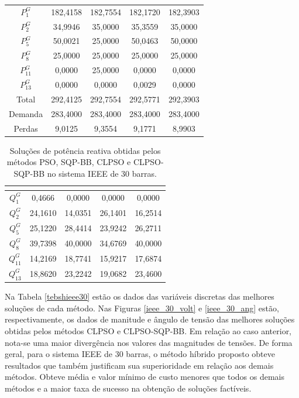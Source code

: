 \documentclass[
	12pt,				%
	openany,			%
	twoside,			%
	a4paper,			%
	chapter=TITLE,		%
	section=Title,		%
	subsection=Title,	%
	subsubsection=Title,%
	english,			%
	french,				%
	spanish,			%
	brazil			%
	]{abntex2}
\begin{document}
\begin{ERRATA}
\begin{table}[h!]
\begin{tabular}{c c c c c}
 \rule{0mm}{3ex} $P^G_1$& 182,4158 & 182,7554& 182,1720 & 182,3903\\[2mm]
$P^G_2$ & 34,9946 & 35,0000 & 35,3559& 35,0000 \\[2mm]
$P^G_5$ & 50,0021 &25,0000 & 50,0463 & 50,0000 \\[2mm]
$P^G_8$  & 25,0000	&25,0000 & 25,0000& 25,0000 \\[2mm]
$P^G_{11}$  & 0,0000 &25,0000 & 0,0000& 0,0000 \\[2mm]
$P^G_{13}$  & 0,0000 &0,0000 & 0,0029& 0,0000 \\[2mm]
Total  & 292,4125 & 292,7554& 292,5771& 292,3903 \\ [2mm]
Demanda & 283,4000 &283,4000 & 283,4000& 283,4000\\[2mm]
Perdas & 9,0125 & 9,3554 & 9,1771& 8,9903 \\[2mm]
\hline
\end{tabular}
\end{table}


\begin{table}[h!]
\centering
\caption{\label{Qieee30}Soluções de potência reativa obtidas pelos métodos PSO, SQP-BB, CLPSO e CLPSO-SQP-BB no sistema IEEE de 30 barras.}
\begin{tabular}{c c c c c}
	\hline
	\textbf{\makecell{Variável (MVAr)}} & \textbf{\makecell{PSO}} &
	\textbf{\makecell{SQP-BB}} &
	\textbf{\makecell{CLPSO}} &\textbf{\makecell{CLPSO-SQP-BB}}\\ 
	\hline

 \rule{0mm}{3ex}
$Q^G_1 $ & 0,4666& 0,0000 &0,0000 & 0,0000 \\[2mm]
$Q^G_2$ &24,1610& 14,0351& 26,1401& 16,2514\\[2mm]
$Q^G_5$ &25,1220 & 28,4414& 23,9242	& 26,2711 \\[2mm]
$Q^G_8 $ & 39,7398& 40,0000	& 34,6769& 40,0000 \\[2mm]
$Q^G_{11}$ &14,2169& 18,7741& 15,9217& 17,6874\\[2mm]
$Q^G_{13}$ &18,8620& 23,2242& 19,0682& 23,4600\\[2mm]
\hline
\end{tabular}
\end{table}

Na Tabela \ref{tebshieee30} estão os dados das variáveis discretas das melhores soluções de cada método. Nas Figuras \ref{ieee_30_volt} e \ref{ieee_30_ang} estão, respectivamente, os dados de manitude e ângulo de tensão das melhores soluções obtidas pelos métodos CLPSO e CLPSO-SQP-BB. Em relação ao caso anterior, nota-se uma maior divergência nos valores das magnitudes de tensões. De forma geral, para o sistema IEEE de 30 barras, o método híbrido proposto obteve resultados que também justificam sua superioridade em relação aos demais métodos. Obteve média e valor mínimo de custo menores que todos os demais métodos e a maior taxa de sucesso na obtenção de soluções factíveis. 


\end{ERRATA}
\end{document}
